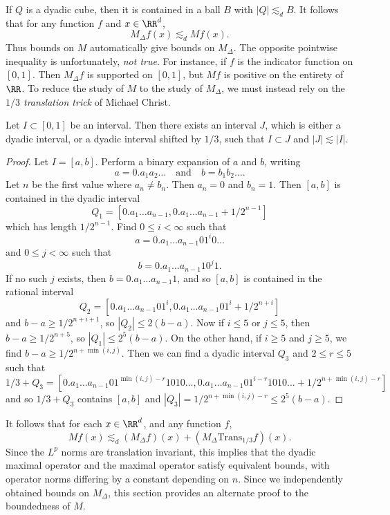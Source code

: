 If $Q$ is a dyadic cube, then it is contained in a ball $B$ with $|Q| \lesssim_d B$. It follows that for any function $f$ and $x \in \RR^d$,
%
\[ M_\Delta f(x) \lesssim_d Mf(x). \]
%
Thus bounds on $M$ automatically give bounds on $M_\Delta$. The opposite pointwise inequality is unfortunately, \emph{not true}. For instance, if $f$ is the indicator function on $[0,1]$. Then $M_\Delta f$ is supported on $[0,1]$, but $Mf$ is positive on the entirety of $\RR$. To reduce the study of $M$ to the study of $M_\Delta$, we must instead rely on the \emph{$1/3$ translation trick} of Michael Christ.

\begin{lemma}
  Let $I \subset [0,1]$ be an interval. Then there exists an interval $J$, which is either a dyadic interval, or a dyadic interval shifted by $1/3$, such that $I \subset J$ and $|J| \lesssim |I|$.
\end{lemma}
\begin{proof}
  Let $I = [a,b]$. Perform a binary expansion of $a$ and $b$, writing
  \[ a = 0.a_1a_2 \dots \quad\text{and}\quad b = b_1 b_2 \dots. \]
  Let $n$ be the first value where $a_n \neq b_n$. Then $a_n = 0$ and $b_n = 1$. Then $[a,b]$ is contained in the dyadic interval
  \[ Q_1 = \left[ 0.a_1 \dots a_{n-1}, 0.a_1\dots a_{n-1} + 1/2^{n-1} \right] \]
  which has length $1/2^{n-1}$. Find $0 \leq i < \infty$ such that
  \[ a = 0.a_1 \dots a_{n-1} 0 1^i 0 \dots \]
  and $0 \leq j < \infty$ such that
  \[ b = 0.a_1 \dots a_{n-1} 1 0^j 1. \]
  If no such $j$ exists, then $b = 0.a_1 \dots a_{n-1} 1$, and so $[a,b]$ is contained in the rational interval
  \[ Q_2 = \left[ 0.a_1 \dots a_{n-1} 0 1^i, 0.a_1 \dots a_{n-1} 0 1^i + 1/2^{n+i} \right] \]
  and $b - a \geq 1/2^{n+i+1}$, so $|Q_2| \leq 2(b - a)$. Now if $i \leq 5$ or $j \leq 5$, then $b - a \geq 1/2^{n+5}$, so $|Q_1| \leq 2^5(b-a)$. On the other hand, if $i \geq 5$ and $j \geq 5$, we find $b - a \geq 1/2^{n+\min(i,j)}$. Then we can find a dyadic interval $Q_3$ and $2 \leq r \leq 5$ such that
  \[ 1/3 + Q_3 = \left[ 0.a_1 \dots a_{n-1} 0 1^{\min(i,j)-r} 1 0 1 0 \dots, 0.a_1 \dots a_{n-1} 0 1^{i-r} 1 0 1 0 \dots + 1/2^{n+\min(i,j)-r}  \right] \]
  and so $1/3 + Q_3$ contains $[a,b]$ and $|Q_3| = 1/2^{n+\min(i,j)-r} \leq 2^5 (b - a)$.
\end{proof}

It follows that for each $x \in \RR^d$, and any function $f$,
%
\[ Mf(x) \lesssim_d (M_\Delta f)(x) + (M_\Delta \text{Trans}_{1/3} f)(x). \]
%
Since the $L^p$ norms are translation invariant, this implies that the dyadic maximal operator and the maximal operator satisfy equivalent bounds, with operator norms differing by a constant depending on $n$. Since we independently obtained bounds on $M_\Delta$, this section provides an alternate proof to the boundedness of $M$.

